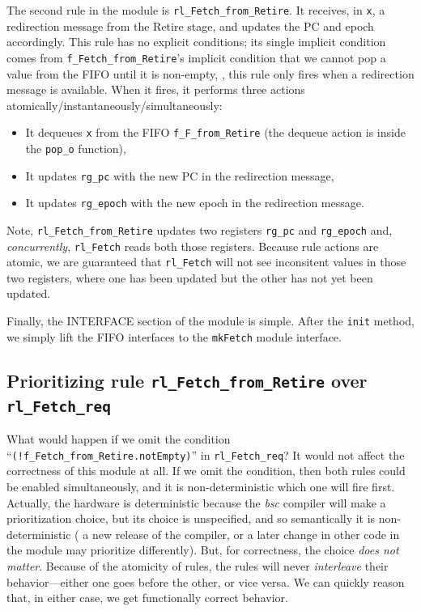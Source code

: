 The second rule in the module is \verb|rl_Fetch_from_Retire|. It
receives, in \verb|x|, a redirection message from the Retire stage,
and updates the PC and epoch accordingly.  This rule has no explicit
conditions; its single implicit condition comes from
\verb|f_Fetch_from_Retire|'s implicit condition that we cannot pop a
value from the FIFO until it is non-empty, {\ie}, this rule only fires
when a redirection message is available.  When it fires, it performs
three actions atomically/instantaneously/simultaneously:
 
\begin{itemize}

 \item It dequeues \verb|x| from the FIFO \verb|f_F_from_Retire| (the
       dequeue action is inside the \verb|pop_o| function),
 \item It updates \verb|rg_pc| with the new PC in the redirection message,
 \item It updates \verb|rg_epoch| with the new epoch in the redirection message.

\end{itemize}

Note, \verb|rl_Fetch_from_Retire| updates two registers \verb|rg_pc|
and \verb|rg_epoch| and, \emph{concurrently}, \verb|rl_Fetch| reads
both those registers.  Because rule actions are atomic, we are
guaranteed that \verb|rl_Fetch| will not see inconsitent values in
those two registers, where one has been updated but the other has not
yet been updated.

Finally, the INTERFACE section of the module is simple.  After the
\verb|init| method, we simply lift the FIFO interfaces to the
\verb|mkFetch| module interface.


\subsection{Prioritizing rule {\tt rl\_Fetch\_from\_Retire} over {\tt rl\_Fetch\_req}}


What would happen if we omit the condition
``\verb|(!f_Fetch_from_Retire.notEmpty)|'' in \verb|rl_Fetch_req|?  It
would not affect the correctness of this module at all.  If we omit
the condition, then both rules could be enabled simultaneously, and it
is non-deterministic which one will fire first.  Actually, the
hardware is deterministic because the \emph{bsc} compiler will make a
prioritization choice, but its choice is unspecified, and so
semantically it is non-deterministic ({\eg} a new release of the
compiler, or a later change in other code in the module may prioritize
differently).  But, for correctness, the choice \emph{does not
matter}.  Because of the atomicity of rules, the rules will never
\emph{interleave} their behavior---either one goes before the other,
or vice versa.  We can quickly reason that, in either case, we get
functionally correct behavior.

